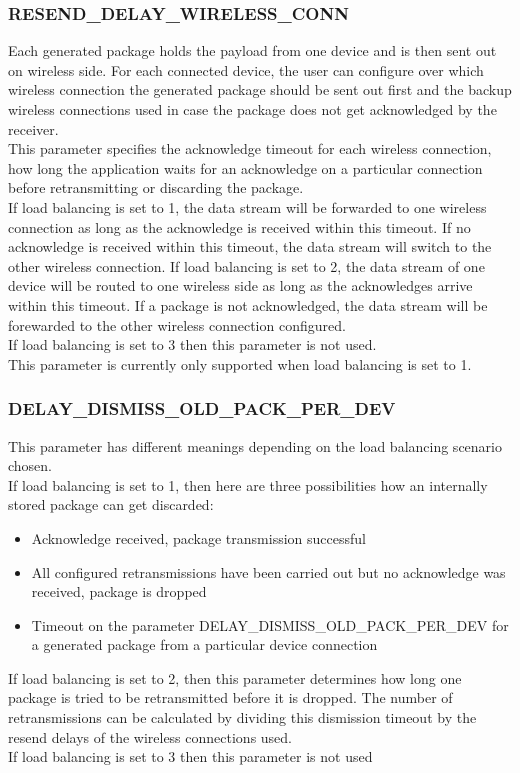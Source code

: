 \subsubsection{RESEND\_DELAY\_WIRELESS\_CONN}
Each generated package holds the payload from one device and is then sent out on wireless side. For each connected device, the user can configure over which wireless connection the generated package should be sent out first and the backup wireless connections used in case the package does not get acknowledged by the receiver.\\
This parameter specifies the acknowledge timeout for each wireless connection, how long the application waits for an acknowledge on a particular connection before retransmitting or discarding the package.\\
If load balancing is set to 1, the data stream will be forwarded to one wireless connection as long as the acknowledge is received within this timeout. If no acknowledge is received within this timeout, the data stream will switch to the other wireless connection.
If load balancing is set to 2, the data stream of one device will be routed to one wireless side as long as the acknowledges arrive within this timeout. If a package is not acknowledged, the data stream will be forewarded to the other wireless connection configured.\\
If load balancing is set to 3 then this parameter is not used.\\
This parameter is currently only supported when load balancing is set to 1.

%
\subsubsection{DELAY\_DISMISS\_OLD\_PACK\_PER\_DEV}
This parameter has different meanings depending on the load balancing scenario chosen.\\
If load balancing is set to 1, then here are three possibilities how an internally stored package can get discarded:
\begin{itemize}
    \item Acknowledge received, package transmission successful
    \item All configured retransmissions have been carried out but no acknowledge was received, package is dropped
    \item Timeout on the parameter DELAY\_DISMISS\_OLD\_PACK\_PER\_DEV for a generated package from a particular device connection
\end{itemize}
If load balancing is set to 2, then this parameter determines how long one package is tried to be retransmitted before it is dropped. The number of retransmissions can be calculated by dividing this dismission timeout by the resend delays of the wireless connections used.\\
If load balancing is set to 3 then this parameter is not used
%
